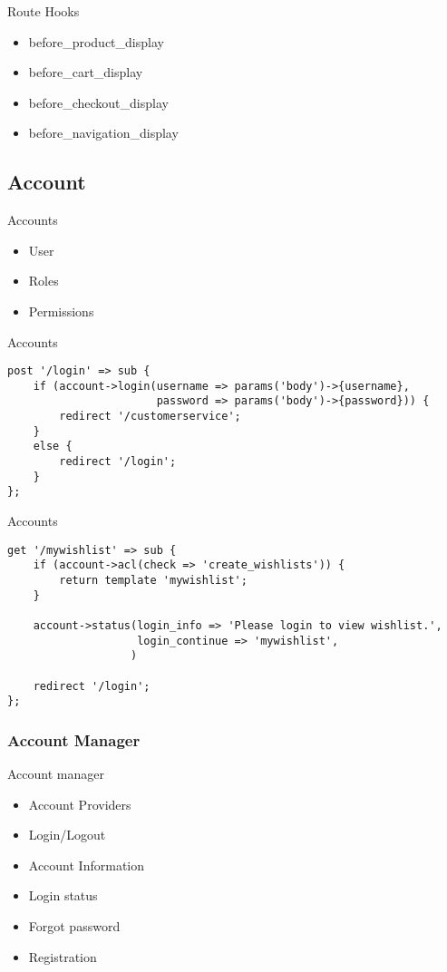 \begin{frame}{Route Hooks}
\begin{itemize}
\item before\_product\_display
\item before\_cart\_display
\item before\_checkout\_display
\item before\_navigation\_display
\end{itemize}
\end{frame}

\subsection{Account}
\begin{frame}{Accounts}
\begin{itemize}
\item User
\item Roles
\item Permissions
\end{itemize}
\end{frame}

\begin{frame}[fragile]{Accounts}
\begin{lstlisting}
post '/login' => sub {
    if (account->login(username => params('body')->{username},
                       password => params('body')->{password})) {
        redirect '/customerservice';
    }
    else {
        redirect '/login';
    }
};
\end{lstlisting}
\end{frame}

\begin{frame}[fragile]{Accounts}
\begin{lstlisting}
get '/mywishlist' => sub {
    if (account->acl(check => 'create_wishlists')) {
        return template 'mywishlist';
    }

    account->status(login_info => 'Please login to view wishlist.',
                    login_continue => 'mywishlist',
                   )

    redirect '/login';
};
\end{lstlisting}
\end{frame}

\subsubsection{Account Manager}
\begin{frame}{Account manager}
\begin{itemize}
\item Account Providers
\item Login/Logout
\item Account Information
\item Login status
\item Forgot password
\item Registration
\end{itemize}
\end{frame}


